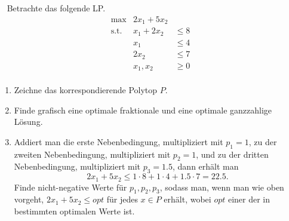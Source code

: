 \documentclass{uebung_cs}
\begin{document}
\begin{aufgabe}\
%
	Betrachte das folgende \acs{LP}.
	\[
		\begin{array}{rrllll}
			\text{max} &   2 x_1 +5 x_2 \\	
			\text{s.t.} 
			&  x_1 + 2x_2 &\leq 8\\
			&  x_1  &\leq 4\\
			& 2x_2 &\leq 7\\
			& x_1,x_2&\geq  0\\
		\end{array}
	\] 
	
	\begin{enumerate}
		\item Zeichne das korrespondierende Polytop $P$.
		\item Finde grafisch eine optimale fraktionale und eine optimale ganzzahlige Lösung.
		\item Addiert man die erste Nebenbedingung, multipliziert mit $p_1 = 1$, zu der zweiten Nebenbedingung, multipliziert mit $p_2 = 1$, und zu der dritten Nebenbedingung, multipliziert mit $p_3 = 1.5$, dann erhält man
		$$2x_1+5x_2\leq 1\cdot 8+ 1\cdot 4+1.5\cdot 7= 22.5.$$
		Finde nicht-negative Werte für $p_1, p_2, p_3$, sodass man, wenn man wie oben vorgeht, $2x_1 + 5x_2 \leq opt$ für jedes $x \in P$ erhält, wobei $opt$ einer der in  bestimmten optimalen Werte ist.
	\end{enumerate}
\end{aufgabe}
\end{document}
